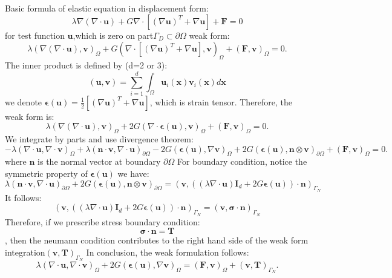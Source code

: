 \documentclass{article}
\begin{document}
Basic formula of elastic equation in displacement form:
\begin{equation}
\lambda\nabla(\nabla \cdot \bm{u})+G \nabla\cdot[(\nabla\bm{u})^T+\nabla\bm{u}]+\bm{F}=0
\end{equation}
for test function $\bm{u}$,which is zero on part$ \Gamma_D\subset \partial \Omega$ weak form:
\begin{equation}
\lambda(\nabla(\nabla \cdot \bm{u}),\bm{v})_{\Omega}+G(\nabla\cdot[(\nabla\bm{u})^T+\nabla\bm{u}],\bm{v})_{\Omega}+(\bm{F},\bm{v})_{\Omega}=0.
\end{equation}
The inner product is defined by (d=2 or 3):
\begin{equation}
(\bm{u},\bm{v})=\sum_{i=1}^d \int_{\Omega}\bm{u}_i(\bm{x})\bm{v}_i(\bm{x})d\bm{x}
\end{equation}
we denote $\bm{\epsilon}(\bm{u})=\frac{1}{2}[(\nabla\bm{u})^T+\nabla\bm{u}]$, which is strain tensor.
Therefore, the weak form is:
\begin{equation}
\lambda(\nabla(\nabla \cdot \bm{u}),\bm{v})_{\Omega}+2G(\nabla\cdot\bm{\epsilon}(\bm{u}),\bm{v})_{\Omega}+(\bm{F},\bm{v})_{\Omega}=0.
\end{equation}
We integrate by parts and use divergence theorem:
\begin{equation}
-\lambda(\nabla \cdot \bm{u},\nabla\cdot\bm{v})_{\Omega}+\lambda(\bm{n}\cdot\bm{v},\nabla\cdot\bm{u})_{\partial\Omega}-2G(\bm{\epsilon}(\bm{u}),\nabla\bm{v})_{\Omega}
+2G(\bm{\epsilon}(\bm{u}),\bm{n}\otimes\bm{v})_{\partial\Omega}+(\bm{F},\bm{v})_{\Omega}=0.
\end{equation}
where $\bm{n}$ is the normal vector at boundary $\partial\Omega$
For boundary condition, notice the symmetric property of $\bm{\epsilon}(\bm{u})$
we have:
\begin{equation}
\lambda(\bm{n}\cdot\bm{v},\nabla\cdot\bm{u})_{\partial\Omega}
+2G(\bm{\epsilon}(\bm{u}),\bm{n}\otimes\bm{v})_{\partial\Omega}=(\bm{v},((\lambda\nabla\cdot\bm{u})\bm{I}_d+2G\bm{\epsilon}(\bm{u}))\cdot\bm{n})_{\Gamma_N}
\end{equation}
It follows:
\begin{equation}
(\bm{v},((\lambda\nabla\cdot\bm{u})\bm{I}_d+2G\bm{\epsilon}(\bm{u}))\cdot\bm{n})_{\Gamma_N}=(\bm{v},\bm{\sigma}\cdot\bm{n})_{\Gamma_N}
\end{equation}
Therefore, if we prescribe stress boundary condition:
\[
\bm{\sigma}\cdot\bm{n}=\bm{T}
\],
then the neumann condition contributes to the right hand side of the weak form integration$(\bm{v},\bm{T})_{\Gamma_N}$
In conclusion, the weak formulation follows:
\begin{equation}
\lambda(\nabla \cdot \bm{u},\nabla\cdot\bm{v})_{\Omega}+2G(\bm{\epsilon}(\bm{u}),\nabla\bm{v})_{\Omega}
=(\bm{F},\bm{v})_{\Omega}+(\bm{v},\bm{T})_{\Gamma_N}.
\end{equation}
\end{document}
